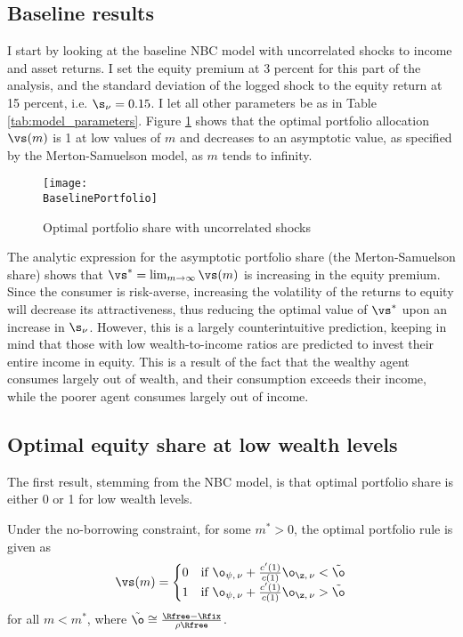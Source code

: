 \subsection{Baseline results}

I start by looking at the baseline NBC model with uncorrelated shocks to income and asset returns. I set the equity premium at 3 percent for this part of the analysis, and the standard deviation of the logged shock to the equity return at 15 percent, i.e. $\s_{\nu} = 0.15$. I let all other parameters be as in Table \ref{tab:model_parameters}. Figure \ref{fig:baseline_portfolio} shows that the optimal portfolio allocation $\vs(m)$ is 1 at low values of $m$ and decreases to an asymptotic value, as specified by the Merton-Samuelson model, as $m$ tends to infinity.

\begin{figure}[h]
    \centering
    \texttt{[image: \\BaselinePortfolio]}
    \caption{Optimal portfolio share with uncorrelated shocks}
    \label{fig:baseline_portfolio}
\end{figure}

The analytic expression for the asymptotic portfolio share (the Merton-Samuelson share) shows that $\vs^* = \lim_{m\to\infty}\vs(m)$ is increasing in the equity premium. Since the consumer is risk-averse, increasing the volatility of the returns to equity will decrease its attractiveness, thus reducing the optimal value of $\vs^*$ upon an increase in $\s_{\nu}$. However, this is a largely counterintuitive prediction, keeping in mind that those with low wealth-to-income ratios are predicted to invest their entire income in equity. This is a result of the fact that the wealthy agent consumes largely out of wealth, and their consumption exceeds their income, while the poorer agent consumes largely out of income.

\subsection{Optimal equity share at low wealth levels}

The first result, stemming from the NBC model, is that optimal portfolio share is either 0 or 1 for low wealth levels.

\begin{prop}\label{prop:low_wealth_share}
    Under the no-borrowing constraint, for some $m^* > 0$, the optimal portfolio rule is given as
    \[
        \vs(m) = \begin{cases}
            0 & \text{if } \o_{\psi,\,\nu} + \frac{c'(1)}{c(1)}\o_{\z,\,\nu} < \tilde{\o}\\
            1 & \text{if } \o_{\psi,\,\nu} + \frac{c'(1)}{c(1)}\o_{\z,\,\nu} > \tilde{\o}
        \end{cases}
    \]
    for all $m < m^*$, where $\tilde{\o} \cong \frac{\Rfree - \Rfix}{\rho\Rfree}$.
\end{prop}

